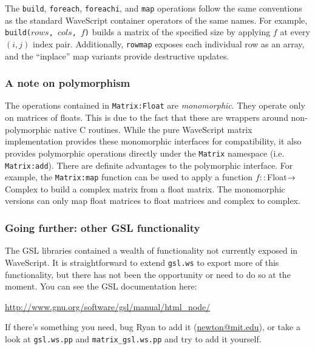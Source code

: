 The {\tt build}, {\tt foreach}, {\tt foreachi}, and {\tt map}
operations follow the same conventions as the standard WaveScript
container operators of the same names.  For example, {\tt
build($rows$, $cols$, $f$)} builds a matrix of the specified size by
applying $f$ at every $(i,j)$ index pair.  Additionally, {\tt rowmap}
exposes each individual row as an array, and the ``inplace'' map
variants provide destructive updates.

\subsubsection{A note on polymorphism}

The operations contained in {\tt Matrix:Float} are {\em monomorphic}.
They operate only on matrices of floats.  This is due to the fact that
these are wrappers around non-polymorphic native C routines.  While
the pure WaveScript matrix implementation provides these monomorphic
interfaces for compatibility, it also provides polymorphic operations
directly under the {\tt Matrix} namespace (i.e. {\tt Matrix:add}).
There are definite advantages to the polymorphic interface.  For
example, the {\tt Matrix:map} function can be used to apply a function
$f :: $Float$ \rightarrow $Complex to build a complex matrix from a float
matrix.  The monomorphic versions can only map float matrices to
float matrices and complex to complex.

\subsubsection{Going further: other GSL functionality}

The GSL libraries contained a wealth of functionality not currently
exposed in WaveScript.  It is straightforward to extend {\tt gsl.ws}
to export more of this functionality, but there has not been the
opportunity or need to do so at the moment.  You can see the GSL
documentation here:

\vspace{-2mm}
\begin{center}
\url{http://www.gnu.org/software/gsl/manual/html_node/}
\end{center}

If there's something you need, bug Ryan to add
it (\url{newton@mit.edu}), or take a look at {\tt gsl.ws.pp} and {\tt matrix\_gsl.ws.pp} and
try to add it yourself.

